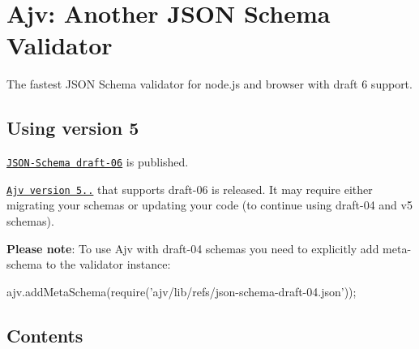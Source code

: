 

\section*{Ajv\+: Another J\+S\+ON Schema Validator}

The fastest J\+S\+ON Schema validator for node.\+js and browser with draft 6 support.

\href{https://travis-ci.org/epoberezkin/ajv}{\tt } \href{https://www.npmjs.com/package/ajv}{\tt } \href{https://www.npmjs.com/package/ajv}{\tt } \href{https://codeclimate.com/github/epoberezkin/ajv}{\tt } \href{https://coveralls.io/github/epoberezkin/ajv?branch=master}{\tt } \href{https://greenkeeper.io/}{\tt } \href{https://gitter.im/ajv-validator/ajv}{\tt }

\subsection*{Using version 5}

\href{https://trac.tools.ietf.org/html/draft-wright-json-schema-validation-01}{\tt J\+S\+O\+N-\/\+Schema draft-\/06} is published.

\href{https://github.com/epoberezkin/ajv/releases/tag/5.0.0}{\tt Ajv version 5..} that supports draft-\/06 is released. It may require either migrating your schemas or updating your code (to continue using draft-\/04 and v5 schemas).

{\bfseries Please note}\+: To use Ajv with draft-\/04 schemas you need to explicitly add meta-\/schema to the validator instance\+:


\begin{DoxyCode}
ajv.addMetaSchema(require('ajv/lib/refs/json-schema-draft-04.json'));
\end{DoxyCode}


\subsection*{Contents}


